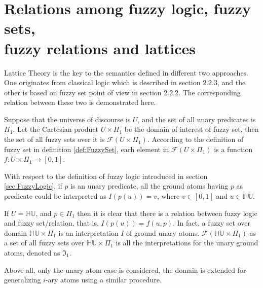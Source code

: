\documentclass[Thesis.tex]{subfiles}
\begin{document}
\section{Relations among fuzzy logic, fuzzy sets,\\ fuzzy relations and lattices}
\label{chap:CorrespondingRelation}
Lattice Theory is the key to the semantics defined in different two approaches. One originates from classical logic which is described in section 2.2.3, and the other is based on fuzzy set point of view in section 2.2.2. The corresponding relation between these two is demonstrated  here.

Suppose that the universe of discourse is $U$, and the set of all unary predicates is $\Pi_1$. Let the Cartesian product $U \times \Pi_1$ be the domain of interest of fuzzy set, then the set of all fuzzy sets over it is $\mathcal{F}(U \times \Pi_1)$. According to the definition of fuzzy set in definition \ref{def:FuzzySet}, each element in $\mathcal{F}(U \times \Pi_1)$ is a function $f : U \times \Pi_1 \rightarrow [0,1]$. 

With respect to the definition of fuzzy logic introduced in section \ref{sec:FuzzyLogic}, if $p$ is an unary predicate, all the ground atoms having $p$ as predicate could be interpreted as $I(p(u))=v$, where $v \in [0,1]$ and $u \in \mathbb{HU}$.

If $U=\mathbb{HU}$, and $p \in \Pi_1$ then it is clear that there is a relation between fuzzy logic and fuzzy set/relation, that is, $I(p(u))=f(u,p)$. In fact, a fuzzy set over domain $\mathbb{HU} \times \Pi_1$ is an interpretation $I$ of ground unary atoms. $\mathcal{F}(\mathbb{HU} \times \Pi_1)$ as a set of all fuzzy sets over $\mathbb{HU} \times \Pi_1$ is all the interpretations for the unary ground atoms, denoted as $\mathfrak{I}_1$.

Above all, only the unary atom case is considered, the domain is extended for generalizing $i$-ary atoms using a similar procedure.
\end{document}
